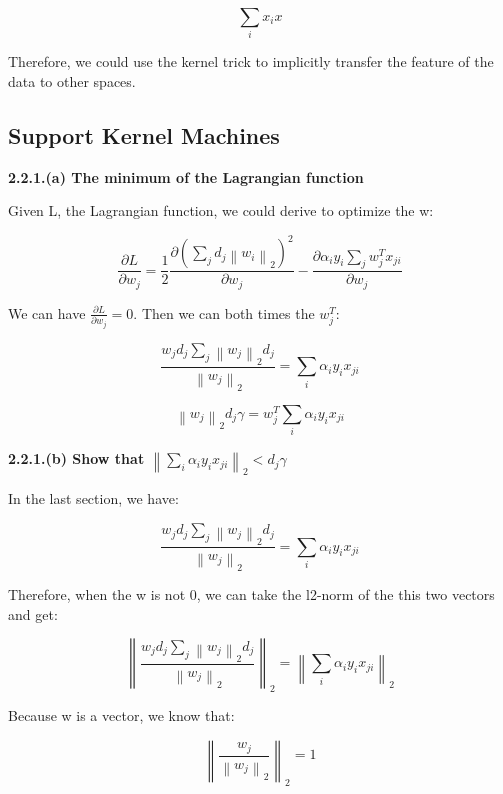\documentclass{article} %
\newcommand{\norm}[1]{\left\lVert #1 \right\rVert}
\begin{document}
\begin{equation}
\sum_i x_i x
\end{equation}

Therefore, we could use the kernel trick to implicitly transfer the feature of
the data to other spaces.


\subsection{Support Kernel Machines}

\textbf{2.2.1.(a) The minimum of the Lagrangian function}

Given L, the Lagrangian function, we could derive to optimize the w:

\begin{equation}
\frac{\partial L}{\partial w_j} = \frac{1}{2} \frac{\partial (\sum_j d_j
\norm{w_i}_2)^2}{\partial w_j} - \frac{\partial \alpha_i y_i \sum_j w_j^T
x_{ji}}{\partial w_j}
\end{equation}

We can have $\frac{\partial L}{\partial w_j} = 0$. Then we can both times the
$w_j^T$:

\begin{equation}
\frac{w_j d_j \sum_j \norm{w_j}_2 d_j }{\norm{w_j}_2} = \sum_i \alpha_i y_i x_{ji}
\end{equation}

\begin{equation}
\norm{w_j}_2 d_j \gamma = w_j^T \sum_i \alpha_i y_i x_{ji}
\end{equation}

\textbf{2.2.1.(b) Show that $\norm{\sum_i \alpha_i y_i x_{ji}}_2 < d_j \gamma$}

In the last section, we have:

\begin{equation}
\frac{w_j d_j \sum_j \norm{w_j}_2 d_j }{\norm{w_j}_2} = \sum_i \alpha_i y_i x_{ji}
\end{equation}

Therefore, when the w is not 0, we can take the l2-norm of the this two vectors
and get:

\begin{equation}
\norm{\frac{w_j d_j \sum_j \norm{w_j}_2 d_j }{\norm{w_j}_2}}_2
= \norm{\sum_i \alpha_i y_i x_{ji}}_2
\end{equation}

Because w is a vector, we know that:

\begin{equation}
\norm{\frac{w_j}{\norm{w_j}_2}}_2 = 1
\end{equation}
\end{document}
